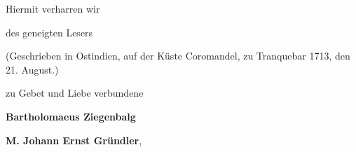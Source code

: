 \documentclass{article}
\begin{document}
\bigskip

Hiermit verharren wir

\bigskip

\hspace*{5mm}des geneigten Lesers

\bigskip

\hspace*{15mm}(Geschrieben in Ostindien, auf der Küste Coromandel, zu Tranquebar 1713, den 21. August.)

\bigskip

\hspace*{10mm}zu Gebet und Liebe verbundene

\bigskip

\hspace*{25mm}\textbf{Bartholomaeus Ziegenbalg}

\bigskip

\hspace*{25mm}\textbf{M. Johann Ernst Gründler},

\bigskip
\end{document}

